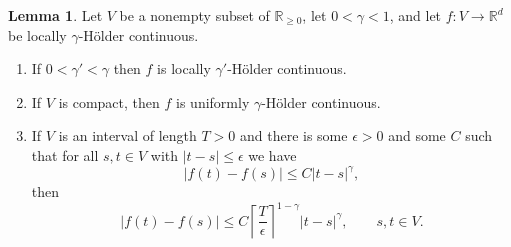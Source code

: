 \documentclass{article}
\theoremstyle{definition}
\newtheorem{lemma}[theorem]{Lemma}
\theoremstyle{definition}
\begin{document}
\begin{lemma}
Let $V$ be a nonempty subset of $\mathbb{R}_{\geq 0}$, let $0<\gamma<1$, and let
$f:V \to \mathbb{R}^d$ be locally $\gamma$-H\"older continuous. 
\begin{enumerate}
\item If $0<\gamma'<\gamma$ then $f$ is locally $\gamma'$-H\"older continuous.
\item If $V$ is compact, then $f$ is uniformly $\gamma$-H\"older continuous.
\item If $V$ is an interval of length $T>0$ and there is some $\epsilon>0$ and some $C$ such that for all
$s,t \in V$ with $|t-s| \leq \epsilon$ we have
\begin{equation}
|f(t)-f(s)| \leq C |t-s|^\gamma,
\label{epsilon}
\end{equation}
then
\[
|f(t)-f(s)| \leq C \left\lceil \frac{T}{\epsilon} \right\rceil^{1-\gamma}  |t-s|^\gamma, \qquad s,t \in V.
\]
\end{enumerate}
\end{lemma}
\end{document}
